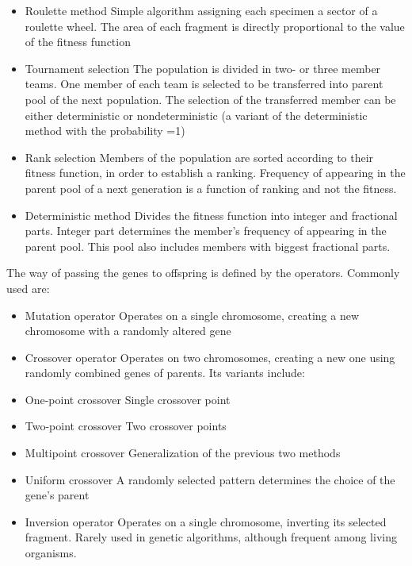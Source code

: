 \documentclass[10pt,oneside]{memoir}
\begin{document}
\begin{itemize}


\item Roulette method
Simple algorithm assigning each specimen a sector of a roulette wheel. The area of each fragment is directly proportional to the value of the fitness function

\item Tournament selection
The population is divided in two- or three member teams. One member of each team is selected to be transferred into parent pool of the next population. The selection of the transferred member can be either deterministic or nondeterministic (a variant of the deterministic method with the probability =1)

\item Rank selection
Members of the population are sorted according to their fitness function, in order to establish a ranking. Frequency of appearing in the parent pool of a next generation is a function of ranking and not the fitness.

\item Deterministic method
Divides the fitness function into integer and fractional parts. Integer part determines the member's frequency of appearing in the parent pool. This pool also includes members with biggest fractional parts.
\end{itemize}

The way of passing the genes to offspring is defined by the operators.
Commonly used are:


\begin{itemize}


\item Mutation operator
Operates on a single chromosome, creating a new chromosome with a randomly altered gene

\item Crossover operator
Operates on two chromosomes, creating a new one using randomly combined genes of parents. Its variants include:

\item One-point crossover
Single crossover point

\item Two-point crossover
Two crossover points

\item Multipoint crossover
Generalization of the previous two methods

\item Uniform crossover
A randomly selected pattern determines the choice of the gene's parent

\item Inversion operator
Operates on a single chromosome, inverting its selected fragment. Rarely used in genetic algorithms, although frequent among living organisms.
\end{itemize}
\end{document}
